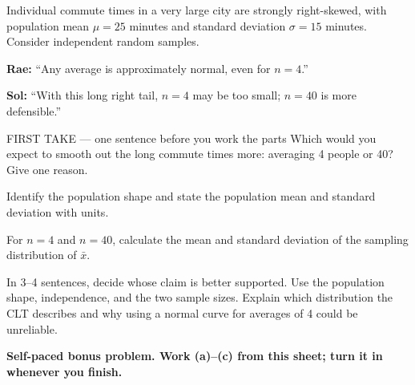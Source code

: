 \documentclass[14pt]{extarticle}
\begin{document}
\pagestyle{empty}


\noindent\begin{minipage}[t]{0.57\linewidth}
\vspace{0pt}
Individual commute times in a very large city are strongly right-skewed, with population mean $\mu=25$ minutes and standard deviation $\sigma=15$ minutes. Consider independent random samples.\par\smallskip \textbf{Rae:} ``Any average is approximately normal, even for $n=4$.''\par \textbf{Sol:} ``With this long right tail, $n=4$ may be too small; $n=40$ is more defensible.''\par
\end{minipage}\hfill
\begin{minipage}[t]{0.40\linewidth}
\vspace{0pt}
\begin{center}
\end{center}
\end{minipage}

\begin{firsttakebox}{FIRST TAKE --- one sentence before you work the parts}
Which would you expect to smooth out the long commute times more: averaging 4 people or 40? Give one reason.
\end{firsttakebox}

\begin{description}[leftmargin=1.15in, labelwidth=1in, itemsep=2pt, topsep=2pt]
  \item[\dokbadge{1}~(a)] Identify the population shape and state the population mean and standard deviation with units.
  \item[\dokbadge{2}~(b)] For $n=4$ and $n=40$, calculate the mean and standard deviation of the sampling distribution of $\bar{x}$.
  \item[\dokbadge{3}~(c)] In 3--4 sentences, decide whose claim is better supported. Use the population shape, independence, and the two sample sizes. Explain which distribution the CLT describes and why using a normal curve for averages of 4 could be unreliable.
\end{description}

\vfill
\textbf{Self-paced bonus problem. Work (a)--(c) from this sheet; turn it in whenever you finish.}
\end{document}
